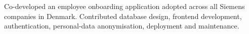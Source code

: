 Co-developed an employee onboarding application adopted across all Siemens companies in Denmark. Contributed database design, frontend development, authentication, personal-data anonymisation, deployment and maintenance.
